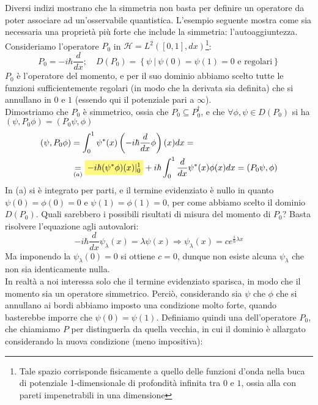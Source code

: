 Diversi indizi mostrano che la simmetria non basta per definire un operatore da poter associare ad un'osservabile quantistica. L'esempio seguente mostra come sia necessaria una proprietà più forte che include la simmetria: l'autoaggiuntezza.
Consideriamo l'operatore $P_0$ in $\mathcal{H}=L^2(\left[0,1\right], dx)$\footnote{Tale spazio corrisponde fisicamente a quello delle funzioni d'onda nella buca di potenziale 1-dimensionale di profondità infinita tra $0$ e $1$, ossia alla  con pareti impenetrabili in una dimensione}:
\[
P_0=-i\hbar\frac{d}{dx};\quad D\left(P_0\right)=\left\{\psi\>|\> \psi\left(0\right)= \psi\left(1\right)=0\text{  e regolari}\right\}
\]
$P_0$ è l'operatore del momento, e per il suo dominio abbiamo scelto tutte le funzioni sufficientemente regolari (in modo che la derivata sia definita) che si annullano in $0$ e $1$ (essendo qui il potenziale pari a $\infty$).\\
Dimostriamo che $P_0$ è simmetrico, ossia che $P_0\subseteq P_0^\dag$, e che $\forall\phi, \psi\in D\left(P_0\right)$ si ha $\left(\psi, P_0\phi\right)=\left(P_0\psi, \phi\right)$
\begin{align*}
(\psi,P_0\phi) &= \int_0^1 \psi^*(x) \left ( -i\hbar \frac{d}{dx} \phi \right)(x) dx =\\
&\underset{(a)}{=} \hlc{Yellow}{-i\hbar (\psi^*\phi)(x)|_0^1} + i\hbar \int_0^1 \frac{d}{dx}\psi^*(x) \phi(x) dx = (P_0\psi, \phi)
\end{align*}
In (a) si è integrato per parti, e il termine evidenziato è nullo in quanto $\psi\left(0\right)= \phi\left(0\right)=0$ e $\psi\left(1\right)= \phi\left(1\right)=0$, per come abbiamo scelto il dominio $D(P_0)$.
Quali sarebbero i possibili risultati di misura del momento di $P_0$? Basta risolvere l'equazione agli autovalori:
\[
-i\hbar\frac{d}{dx}\psi_\lambda\left(x\right)=\lambda\psi\left(x\right)\Rightarrow \psi_\lambda\left(x\right)=c e^{\frac{i}{\hbar}\lambda x}
\]
Ma imponendo la $\psi_\lambda\left(0\right)=0$ si ottiene $c=0$, dunque non esiste alcuna $\psi_\lambda$ che non sia identicamente nulla. \\
In realtà a noi interessa solo che il termine evidenziato sparisca, in modo che il momento sia un operatore simmetrico. Perciò, considerando sia $\psi$ che $\phi$ che si annullano ai bordi abbiamo imposto una condizione molto forte, quando basterebbe imporre che $\psi(0) = \psi(1)$. Definiamo quindi una  dell'operatore $P_0$, che chiamiamo $P$ per distinguerla da quella vecchia, in cui il dominio è allargato considerando la nuova condizione (meno impositiva):
